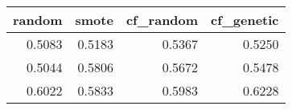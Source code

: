 \begin{tabular}{rrrr}
\toprule
 random &  smote &  cf\_random &  cf\_genetic \\
\midrule
 0.5083 & 0.5183 &     0.5367 &      0.5250 \\
 0.5044 & 0.5806 &     0.5672 &      0.5478 \\
 0.6022 & 0.5833 &     0.5983 &      0.6228 \\
\bottomrule
\end{tabular}
